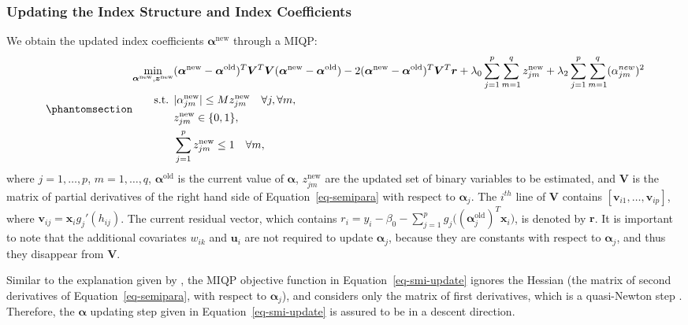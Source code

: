 \documentclass[
  11pt,
  a4paper,
]{article}
\begin{document}
\subsubsection{Updating the Index Structure and Index
Coefficients}\label{sec-step3}

We obtain the updated index coefficients \(\bm{\alpha}^{\text{new}}\)
through a MIQP: \begin{equation}\phantomsection\label{eq-smi-update}{
\begin{aligned}
  \min_{\bm{\alpha}^{\text{new}}, \bm{z}^{\text{new}}} & (\bm{\alpha}^{\text{new}} - \bm{\alpha}^{\text{old}})^{T}\bm{V}^{T}\bm{V}(\bm{\alpha}^{\text{new}} - \bm{\alpha}^{\text{old}}) - 2(\bm{\alpha}^{\text{new}} - \bm{\alpha}^{\text{old}})^{T}\bm{V}^{T}\bm{r} + \lambda_{0}\sum_{j = 1}^{p}\sum_{m = 1}^{q}z_{jm}^{\text{new}} + \lambda_{2}\sum_{j = 1}^{p}\sum_{m = 1}^{q}(\alpha_{jm}^{new})^2 \\
  \text{s.t. } & |\alpha_{jm}^{\text{new}}| \le Mz_{jm}^{\text{new}} \quad \forall j, \forall m,\\
  & z_{jm}^{\text{new}} \in \{0, 1\}, \\
  & \sum_{j = 1}^{p}z_{jm}^{\text{new}} \le 1 \quad \forall m,
\end{aligned}
}\end{equation} where \(j = 1, \dots, p\), \(m = 1, \dots, q\),
\(\bm{\alpha}^{\text{old}}\) is the current value of \(\bm{\alpha}\),
\(z_{jm}^{\text{new}}\) are the updated set of binary variables to be
estimated, and \(\bm{V}\) is the matrix of partial derivatives of the
right hand side of Equation~\ref{eq-semipara} with respect to
\(\bm{\alpha}_{j}\). The \(i^{th}\) line of \(\bm{V}\) contains
\([ \bm{v}_{i1}, \dots, \bm{v}_{ip}]\), where
\(\bm{v}_{ij} = \bm{x}_{i}g_{j}'(h_{ij})\). The current residual vector,
which contains
\(r_{i} = y_{i} - \beta_{0} - \sum_{j = 1}^{p}g_{j}\big((\bm{\alpha}_{j}^{\text{old}})^T\bm{x}_{i}\big)\),
is denoted by \(\bm{r}\). It is important to note that the additional
covariates \(w_{ik}\) and \(\bm{u}_{i}\) are not required to update
\(\bm{\alpha}_{j}\), because they are constants with respect to
\(\bm{\alpha}_{j}\), and thus they disappear from \(\bm{V}\).

Similar to the explanation given by \textcite{Masselot2022}, the MIQP
objective function in Equation~\ref{eq-smi-update} ignores the Hessian
(the matrix of second derivatives of Equation~\ref{eq-semipara}, with
respect to \(\bm{\alpha}_{j}\)), and considers only the matrix of first
derivatives, which is a quasi-Newton step \autocite{Peng2022}.
Therefore, the \(\bm{\alpha}\) updating step given in
Equation~\ref{eq-smi-update} is assured to be in a descent direction.
\end{document}
